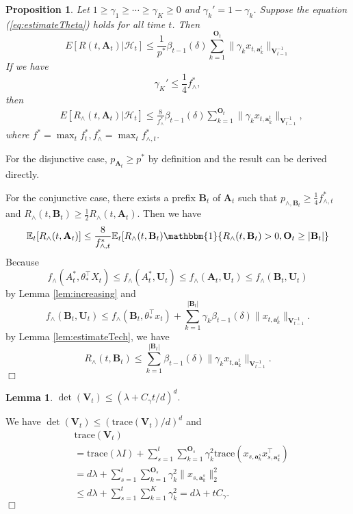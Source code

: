 \documentclass{article}
\newcommand{\EE}{\mathbb{E}}
\newcommand{\bOne}{\mathbbm{1}}
\newcommand{\bA}{\mathbf{A}}
\newcommand{\ba}{\mathbf{a}}
\newcommand{\bB}{\mathbf{B}}
\newcommand{\bO}{\mathbf{O}}
\newcommand{\bU}{\mathbf{U}}
\newcommand{\bV}{\mathbf{V}}
\newcommand{\cH}{\mathcal{H}}
\newcommand{\trace}{\mathrm{trace}}
\newcommand{\abs}[1]{\left| #1 \right|}
\newcommand{\norm}[1]{\| #1 \|}
\newtheorem{proposition}[theorem]{Proposition}%
\newtheorem{lemma}[theorem]{Lemma}%
\newenvironment{proof}{\noindent {\textbf{Proof. }}}{$\Box$ \medskip}
\begin{document}
\begin{proposition}
Let $1 \geq \gamma_1 \geq \cdots \geq \gamma_K \geq 0$ and $\gamma_k' = 1 - \gamma_k$. Suppose the equation (\ref{eq:estimateTheta}) holds for all time $t$. Then
$$
E[R(t, \bA_t)|\cH_t] \leq \frac{1}{p^*} \beta_{t-1}(\delta)\sum_{k=1}^{\bO_t}\norm{\gamma_k x_{t,\ba_k^t}}_{\bV_{t-1}^{-1}}
$$
If we have
$$
\gamma_K' \le \frac{1}{4} f_{\wedge}^{\ast},
$$
then
\begin{align*}
&E[R_{\wedge}(t, \bA_t)|\cH_t] \leq \frac{8}{f_{\wedge}^{\ast}} \beta_{t-1}(\delta)\sum_{k=1}^{\bO_t}\norm{\gamma_k x_{t,\ba_k^t}}_{\bV_{t-1}^{-1}},
\end{align*}
where $f^{\ast} = \max_{t} f_t^{\ast}, f_{\wedge}^{\ast} = \max_{t} f_{\wedge, t}^{\ast}$.
\end{proposition}
\begin{proof}
For the disjunctive case,  $p_{\bA_t} \geq p^*$ by definition and the result can be derived directly.

For the conjunctive case, there exists a prefix $\bB_t$ of $\bA_t$ such that $p_{\wedge, \bB_t} \geq \frac{1}{4}f_{\wedge, t}^*$ and $R_{\wedge}(t, \bB_t) \geq \frac{1}{2} R_{\wedge}(t, \bA_t)$. Then we have
$$
\EE_t[R_{\wedge}(t, \bA_t)] \leq \frac{8}{f_{\wedge, t}^*} \EE_t[R_{\wedge}(t, \bB_t) \bOne\{R_{\wedge}(t, \bB_t) > 0, \bO_t \geq \abs{\bB_t}\}
$$
Because 
$$
f_{\wedge}(A_t^*, \theta_*^{\top}X_t) \leq f_{\wedge}(A_t^*,\bU_t) \leq f_{\wedge}(\bA_t,\bU_t) \leq f_{\wedge}(\bB_t,\bU_t)
$$
by Lemma \ref{lem:increasing} and
$$
f_{\wedge}(\bB_t,\bU_t) \leq f_{\wedge}(\bB_t, \theta_*^{\top}x_t) + \sum_{k=1}^{\abs{\bB_t}}\gamma_k\beta_{t-1}(\delta)\norm{x_{t,\ba_k^t}}_{\bV_{t-1}^{-1}}.
$$
by Lemma \ref{lem:estimateTech}, we have
$$
R_{\wedge}(t, \bB_t) \leq \sum_{k=1}^{\abs{\bB_t}}\beta_{t-1}(\delta)\norm{\gamma_k x_{t,\ba_k^t}}_{\bV_{t-1}^{-1}}.
$$
\end{proof}
	
\begin{lemma} %
$\det(\bV_t) \leq (\lambda + C_\gamma t/d)^d.$
\end{lemma}
\begin{proof}
We have $\det(\bV_t) \leq (\trace(\bV_t)/d)^d$ and
\begin{align*}
&\trace(\bV_t)\\
& = \trace(\lambda I) + \sum_{s=1}^t \sum_{k=1}^{\bO_s} \gamma_k^2 \trace(x_{s,\ba_k^s} x_{s,\ba_k^s}^{\top})\\	
& = d \lambda + \sum_{s=1}^t \sum_{k=1}^{\bO_s} \gamma_k^2 \norm{x_{s,\ba_k^s}}_2^2\\
& \leq d \lambda + \sum_{s=1}^t\sum_{k=1}^{K}\gamma_k^2 = d \lambda + t C_\gamma.
\end{align*}
\end{proof}
\end{document}
